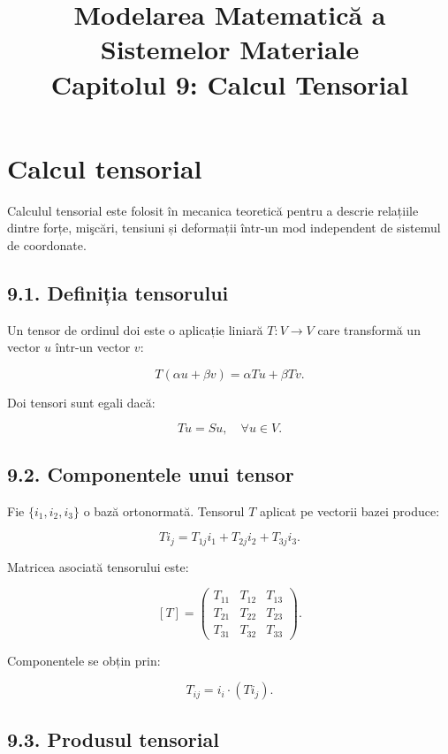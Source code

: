 \documentclass[12pt,a4paper]{article}
\title{Modelarea Matematică a Sistemelor Materiale \\ \large Capitolul 9: Calcul Tensorial}
\author{}
\date{}
\begin{document}
\maketitle

\section{Calcul tensorial}

Calculul tensorial este folosit în mecanica teoretică pentru a descrie relațiile dintre forțe,
mişcări, tensiuni și deformații într-un mod independent de sistemul de coordonate.

\subsection{9.1. Definiția tensorului}

Un tensor de ordinul doi este o aplicație liniară $T : V \to V$ care transformă un vector $u$
într-un vector $v$:


\[
T(\alpha u + \beta v) = \alpha Tu + \beta Tv.
\]



Doi tensori sunt egali dacă:


\[
Tu = Su, \quad \forall u \in V.
\]



\subsection{9.2. Componentele unui tensor}

Fie $\{i_1,i_2,i_3\}$ o bază ortonormată. Tensorul $T$ aplicat pe vectorii bazei produce:


\[
Ti_j = T_{1j} i_1 + T_{2j} i_2 + T_{3j} i_3.
\]



Matricea asociată tensorului este:


\[
[T] =
\begin{pmatrix}
T_{11} & T_{12} & T_{13} \\
T_{21} & T_{22} & T_{23} \\
T_{31} & T_{32} & T_{33}
\end{pmatrix}.
\]



Componentele se obțin prin:


\[
T_{ij} = i_i \cdot (T i_j).
\]



\subsection{9.3. Produsul tensorial}
\end{document}
